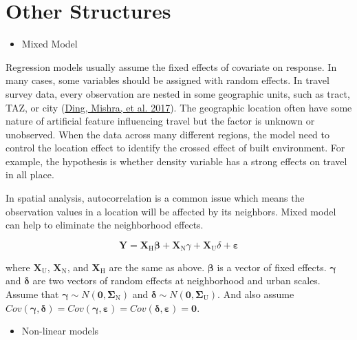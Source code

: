 \documentclass[
  11pt,
  openany]{memoir}
\providecommand{\tightlist}{%
  \setlength{\itemsep}{0pt}\setlength{\parskip}{0pt}}
\begin{document}
\hypertarget{other-structures}{%
\section{Other Structures}\label{other-structures}}

\begin{itemize}
\tightlist
\item
  Mixed Model
\end{itemize}

Regression models usually assume the fixed effects of covariate on response. In many cases, some variables should be assigned with random effects.
In travel survey data, every observation are nested in some geographic units, such as tract, TAZ, or city (\protect\hyperlink{ref-dingInfluencesBuiltEnvironment2017}{Ding, Mishra, et al. 2017}).
The geographic location often have some nature of artificial feature influencing travel but the factor is unknown or unobserved.
When the data across many different regions, the model need to control the location effect to identify the crossed effect of built environment. For example, the hypothesis is whether density variable has a strong effects on travel in all place.

In spatial analysis, autocorrelation is a common issue which means the observation values in a location will be affected by its neighbors. Mixed model can help to eliminate the neighborhood effects.

\begin{equation}
\label{eq:multiscale}
\mathbf{Y}=\mathbf{X}_\mathrm{H}\boldsymbol{\beta}+\mathbf{X}_\mathrm{N}{\gamma}+\mathbf{X}_\mathrm{U}{\delta}+\boldsymbol{\varepsilon}
\end{equation}

where \(\mathbf{X}_\mathrm{U}\), \(\mathbf{X}_\mathrm{N}\), and \(\mathbf{X}_\mathrm{H}\) are the same as above. \(\boldsymbol{\beta}\) is a vector of fixed effects. \(\boldsymbol{\gamma}\) and \(\boldsymbol{\delta}\) are two vectors of random effects at neighborhood and urban scales. Assume that \(\boldsymbol{\gamma}\sim N(\mathbf{0}, \boldsymbol{\Sigma}_\mathrm{N})\) and \(\boldsymbol{\delta}\sim N(\mathbf{0}, \boldsymbol{\Sigma}_\mathrm{U})\). And also assume \(Cov(\boldsymbol{\gamma},\boldsymbol{\delta})=Cov(\boldsymbol{\gamma},\boldsymbol{\varepsilon})=Cov(\boldsymbol{\delta},\boldsymbol{\varepsilon})=\mathbf{0}\).

\begin{itemize}
\tightlist
\item
  Non-linear models
\end{itemize}
\end{document}
